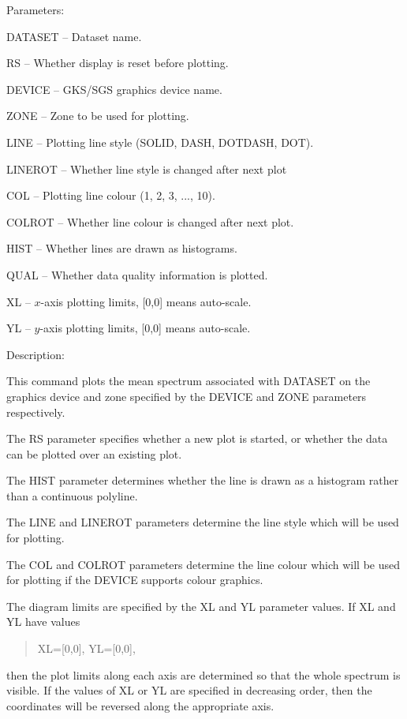 \begin {description}
\begin {description}
\item Parameters:

\begin {description}
\item DATASET -- Dataset name.
\item RS -- Whether display is reset before plotting.
\item DEVICE -- GKS/SGS graphics device name.
\item ZONE -- Zone to be used for plotting.
\item LINE -- Plotting line style (SOLID, DASH, DOTDASH, DOT).
\item LINEROT -- Whether line style is changed after next plot
\item COL -- Plotting line colour (1, 2, 3, ..., 10).
\item COLROT -- Whether line colour is changed after next plot.
\item HIST -- Whether lines are drawn as histograms.
\item QUAL -- Whether data quality information is plotted.
\item XL -- $x$-axis plotting limits, [0,0] means auto-scale.
\item YL -- $y$-axis plotting limits, [0,0] means auto-scale.
\end {description}

\item Description:

This command plots the mean spectrum associated with DATASET on the
graphics device and zone specified by the DEVICE and ZONE parameters 
respectively.

The RS parameter specifies whether a new plot is started, or whether
the data can be plotted over an existing plot.

The HIST parameter determines whether the line is drawn as a histogram
rather than a continuous polyline.

The LINE and LINEROT parameters determine the line style which will be
used for plotting.

The COL and COLROT parameters determine the line colour which will be used
for plotting if the DEVICE supports colour graphics.

The diagram limits are specified by the XL and YL parameter values.
If XL and YL have values

\begin {quote}
XL=[0,0], YL=[0,0],
\end {quote}
then the plot limits along each axis are determined so that the whole
spectrum is visible.
If the values of XL or YL are specified in decreasing order, then
the coordinates will be reversed along the appropriate axis.


\end{description}
\end{description}

